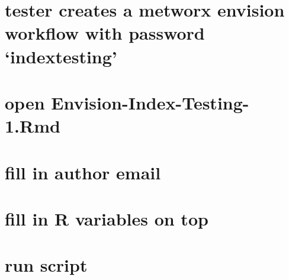 \documentclass[]{article}
\begin{document}
\newpage



{
\hypersetup{linkcolor=black}
\setcounter{tocdepth}{2}
\tableofcontents
}
\section{\texorpdfstring{tester creates a metworx envision workflow with
password
`indextesting'}{tester creates a metworx envision workflow with password indextesting}}\label{tester-creates-a-metworx-envision-workflow-with-password-indextesting}

\section{open
Envision-Index-Testing-1.Rmd}\label{open-envision-index-testing-1.rmd}

\section{fill in author email}\label{fill-in-author-email}

\section{fill in R variables on top}\label{fill-in-r-variables-on-top}

\section{run script}\label{run-script}
\end{document}
